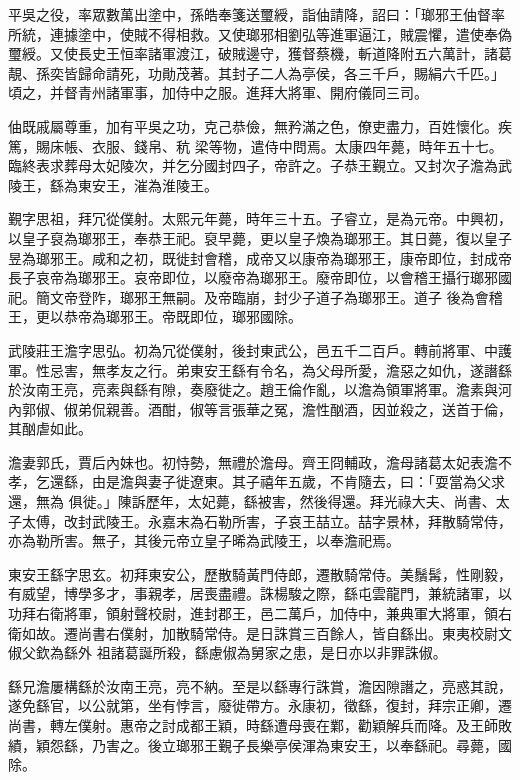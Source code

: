 \begin{pinyinscope}
 平吳之役，率眾數萬出塗中，孫皓奉箋送璽綬，詣伷請降，詔曰：「瑯邪王伷督率所統，連據塗中，使賊不得相救。又使瑯邪相劉弘等進軍逼江，賊震懼，遣使奉偽璽綬。又使長史王恒率諸軍渡江，破賊邊守，獲督蔡機，斬道降附五六萬計，諸葛靚、孫奕皆歸命請死，功勛茂著。其封子二人為亭侯，各三千戶，賜絹六千匹。」頃之，并督青州諸軍事，加侍中之服。進拜大將軍、開府儀同三司。



 伷既戚屬尊重，加有平吳之功，克己恭儉，無矜滿之色，僚吏盡力，百姓懷化。疾篤，賜床帳、衣服、錢帛、秔
 梁等物，遣侍中問焉。太康四年薨，時年五十七。臨終表求葬母太妃陵次，并乞分國封四子，帝許之。子恭王覲立。又封次子澹為武陵王，繇為東安王，漼為淮陵王。



 覲字思祖，拜冗從僕射。太熙元年薨，時年三十五。子睿立，是為元帝。中興初，以皇子裒為瑯邪王，奉恭王祀。裒早薨，更以皇子煥為瑯邪王。其日薨，復以皇子昱為瑯邪王。咸和之初，既徙封會稽，成帝又以康帝為瑯邪王，康帝即位，封成帝長子哀帝為瑯邪王。哀帝即位，以廢帝為瑯邪王。廢帝即位，以會稽王攝行瑯邪國祀。簡文帝登阼，瑯邪王無嗣。及帝臨崩，封少子道子為瑯邪王。道子
 後為會稽王，更以恭帝為瑯邪王。帝既即位，瑯邪國除。



 武陵莊王澹字思弘。初為冗從僕射，後封東武公，邑五千二百戶。轉前將軍、中護軍。性忌害，無孝友之行。弟東安王繇有令名，為父母所愛，澹惡之如仇，遂譖繇於汝南王亮，亮素與繇有隙，奏廢徙之。趙王倫作亂，以澹為領軍將軍。澹素與河內郭俶、俶弟侃親善。酒酣，俶等言張華之冤，澹性酗酒，因並殺之，送首于倫，其酗虐如此。



 澹妻郭氏，賈后內妹也。初恃勢，無禮於澹母。齊王冏輔政，澹母諸葛太妃表澹不孝，乞還繇，由是澹與妻子徙遼東。其子禧年五歲，不肯隨去，曰：「耍當為父求還，無為
 俱徙。」陳訴歷年，太妃薨，繇被害，然後得還。拜光祿大夫、尚書、太子太傅，改封武陵王。永嘉末為石勒所害，子哀王喆立。喆字景林，拜散騎常侍，亦為勒所害。無子，其後元帝立皇子晞為武陵王，以奉澹祀焉。



 東安王繇字思玄。初拜東安公，歷散騎黃門侍郎，遷散騎常侍。美鬚髯，性剛毅，有威望，博學多才，事親孝，居喪盡禮。誅楊駿之際，繇屯雲龍門，兼統諸軍，以功拜右衛將軍，領射聲校尉，進封郡王，邑二萬戶，加侍中，兼典軍大將軍，領右衛如故。遷尚書右僕射，加散騎常侍。是日誅賞三百餘人，皆自繇出。東夷校尉文俶父欽為繇外
 祖諸葛誕所殺，繇慮俶為舅家之患，是日亦以非罪誅俶。



 繇兄澹屢構繇於汝南王亮，亮不納。至是以繇專行誅賞，澹因隙譖之，亮惑其說，遂免繇官，以公就第，坐有悖言，廢徙帶方。永康初，徵繇，復封，拜宗正卿，遷尚書，轉左僕射。惠帝之討成都王穎，時繇遭母喪在鄴，勸穎解兵而降。及王師敗績，穎怨繇，乃害之。後立瑯邪王覲子長樂亭侯渾為東安王，以奉繇祀。尋薨，國除。




\end{pinyinscope}
